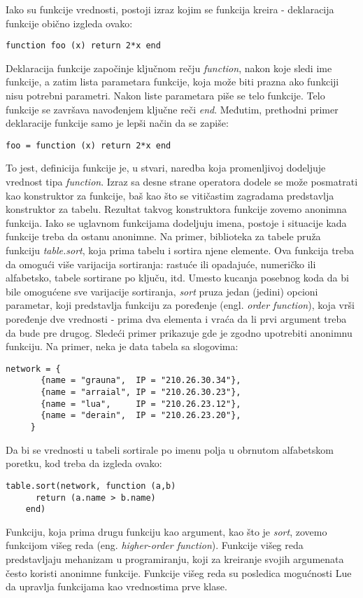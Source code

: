 \documentclass[a4paper]{article}
\begin{document}
Iako su funkcije vrednosti, postoji izraz kojim se funkcija kreira - deklaracija funkcije obično izgleda ovako:
\begin{lstlisting}[caption={Deklaracija funkcije \cite{bookProgInLua}},frame=single, label=fun1]
    function foo (x) return 2*x end
\end{lstlisting}
Deklaracija funkcije započinje ključnom rečju \textit{function}, nakon koje sledi ime funkcije, a zatim lista parametara funkcije, koja može biti prazna ako funkciji nisu potrebni parametri. Nakon liste parametara piše se telo funkcije. Telo funkcije se završava navođenjem ključne reči \textit{end}.
Međutim, prethodni primer deklaracije funkcije samo je lepši način da se zapiše:
\begin{lstlisting}[caption={Dodela vrednosti tipa \textit{function} promenljivoj foo \cite{bookProgInLua}},frame=single, label=fun1]
    foo = function (x) return 2*x end
\end{lstlisting}
To jest, definicija funkcije je, u stvari, naredba koja promenljivoj dodeljuje vrednost tipa \textit{function}. Izraz sa desne strane operatora dodele se može posmatrati kao konstruktor za funkcije, baš kao što se vitičastim zagradama predstavlja konstruktor za tabelu. Rezultat takvog konstruktora funkcije zovemo anonimna funkcija. Iako se uglavnom funkcijama dodeljuju imena, postoje i situacije kada funkcije treba da ostanu anonimne. Na primer, biblioteka za tabele pruža funkciju \textit{table.sort}, koja prima tabelu i sortira njene elemente. Ova funkcija treba da omogući više varijacija sortiranja: rastuće ili opadajuće, numeričko ili alfabetsko, tabele sortirane po ključu, itd. Umesto kucanja posebnog koda da bi bile omogućene sve varijacije sortiranja, \textit{sort} pruza jedan (jedini) opcioni parametar, koji predstavlja funkciju za poređenje (engl. \textit{order function}), koja vrši poređenje dve vrednosti - prima dva elementa i vraća da li prvi argument treba da bude pre drugog. Sledeći primer prikazuje gde je zgodno upotrebiti anonimnu funkciju. Na primer, neka je data tabela sa slogovima:
\begin{lstlisting}[caption={Primer tabele \cite{bookProgInLua}},frame=single, label=fun2]
     network = {
       {name = "grauna",  IP = "210.26.30.34"},
       {name = "arraial", IP = "210.26.30.23"},
       {name = "lua",     IP = "210.26.23.12"},
       {name = "derain",  IP = "210.26.23.20"},
     }
\end{lstlisting}
Da bi se vrednosti u tabeli sortirale po imenu polja u obrnutom alfabetskom poretku, kod treba da izgleda ovako:
\begin{lstlisting}[caption={Sortiranje vrednosti tabele \cite{bookProgInLua}},frame=single, label=fun3]
    table.sort(network, function (a,b)
      return (a.name > b.name)
    end)
\end{lstlisting}
Funkciju, koja prima drugu funkciju kao argument, kao što je \textit{sort}, zovemo funkcijom višeg reda (eng. \textit{higher-order function}). Funkcije višeg reda predstavljaju mehanizam u programiranju, koji za kreiranje svojih argumenata često koristi anonimne funkcije. Funkcije višeg reda su posledica mogućnosti Lue da upravlja funkcijama kao vrednostima prve klase.
\end{document}

